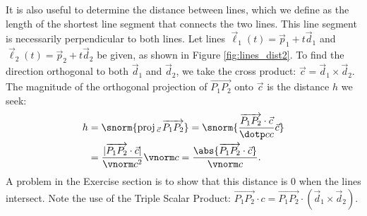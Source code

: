 
It is also useful to determine the distance between lines, which we define as the length of the shortest line segment that connects the two lines. This line segment is necessarily perpendicular to both lines. Let lines $\vec\ell_1(t) = \vec p_1 + t\vec d_1$ and $\vec\ell_2(t) = \vec p_2 + t\vec d_2$ be given, as shown in Figure \ref{fig:lines_dist2}. To find the direction orthogonal to both $\vec d_1$ and $\vec d_2$, we take the cross product: $\vec c = \vec d_1\times \vec d_2$. The magnitude of the orthogonal projection of $\overrightarrow{P_1P_2}$ onto $\vec c$ is the distance $h$ we seek:
\begin{align}
h&=		\snorm{\text{proj}\,_{\vec c}\,\overrightarrow{P_1P_2}} = \snorm{\frac{\overrightarrow{P_1P_2}\cdot\vec c}{\dotp cc}\vec c} \nonumber\\
	&=\frac{\lvert\overrightarrow{P_1P_2}\cdot \vec c\rvert}{\vnorm c^2}\vnorm c =\frac{\abs{\overrightarrow{P_1P_2}\cdot \vec c}}{\vnorm c}.\label{eq:skewlinesdist}
\end{align}
A problem in the Exercise section is to show that this distance is 0 when the lines intersect. Note the use of the Triple Scalar Product: $\overrightarrow{P_1P_2}\cdot c = \overrightarrow{P_1P_2}\cdot (\vec d_1\times \vec d_2).$\\







